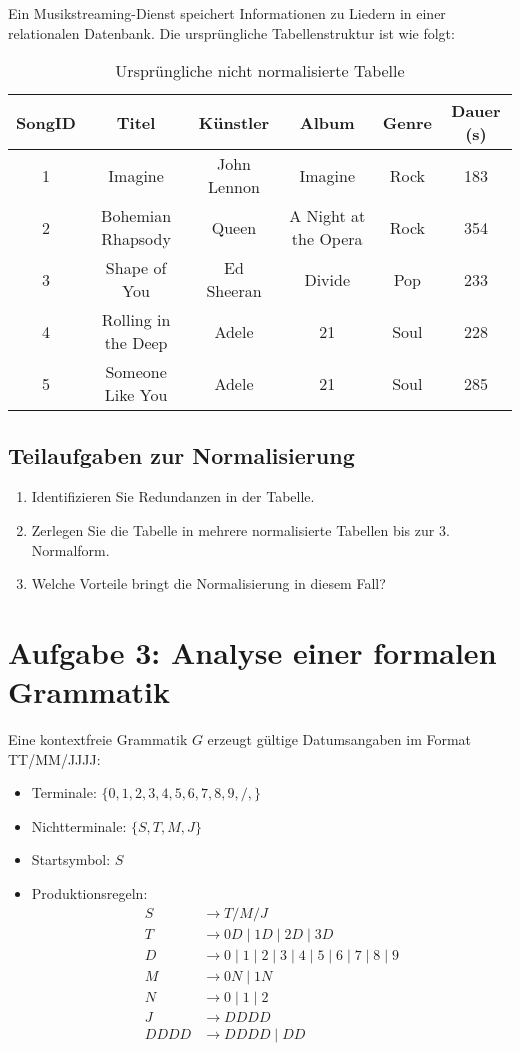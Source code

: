\documentclass[a4paper,12pt]{article}
\begin{document}
	Ein Musikstreaming-Dienst speichert Informationen zu Liedern in einer relationalen Datenbank. Die ursprüngliche Tabellenstruktur ist wie folgt:
	
	\begin{table}[h]
		\centering
		\caption{Ursprüngliche nicht normalisierte Tabelle}
		\begin{tabular}{|c|c|c|c|c|c|}
			\hline
			SongID & Titel & Künstler & Album & Genre & Dauer (s) \\
			\hline
			1 & Imagine & John Lennon & Imagine & Rock & 183 \\
			2 & Bohemian Rhapsody & Queen & A Night at the Opera & Rock & 354 \\
			3 & Shape of You & Ed Sheeran & Divide & Pop & 233 \\
			4 & Rolling in the Deep & Adele & 21 & Soul & 228 \\
			5 & Someone Like You & Adele & 21 & Soul & 285 \\
			\hline
		\end{tabular}
	\end{table}
	
	\subsection*{Teilaufgaben zur Normalisierung}
	\begin{enumerate}
		\item Identifizieren Sie Redundanzen in der Tabelle.
		\item Zerlegen Sie die Tabelle in mehrere normalisierte Tabellen bis zur 3. Normalform.
		\item Welche Vorteile bringt die Normalisierung in diesem Fall?
	\end{enumerate}
	
	\section*{Aufgabe 3: Analyse einer formalen Grammatik}
	
	Eine kontextfreie Grammatik \( G \) erzeugt gültige Datumsangaben im Format TT/MM/JJJJ:
	\begin{itemize}
		\item Terminale: \( \{0,1,2,3,4,5,6,7,8,9,/,\} \)
		\item Nichtterminale: \( \{S, T, M, J\} \)
		\item Startsymbol: \( S \)
		\item Produktionsregeln:
		\begin{align*}
			S &\to T / M / J \\
			T &\to 0D \mid 1D \mid 2D \mid 3D \\
			D &\to 0 \mid 1 \mid 2 \mid 3 \mid 4 \mid 5 \mid 6 \mid 7 \mid 8 \mid 9 \\
			M &\to 0N \mid 1N \\
			N &\to 0 \mid 1 \mid 2 \\
			J &\to DDDD \\
			DDDD &\to DDDD \mid DD
		\end{align*}
	\end{itemize}
	
\end{document}

